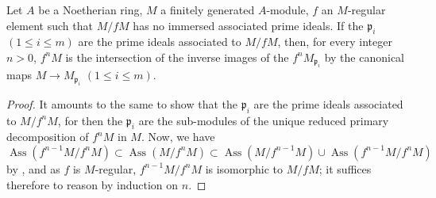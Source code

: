 \begin{proposition}[3.4.9]
\label{IV.3.4.9}
Let $A$ be a Noetherian ring, $M$ a finitely generated $A$-module, $f$ an $M$-regular element such that $M/fM$ has no immersed associated prime ideals.
If the $\mathfrak{p}_i$ $(1\leqslant i\leqslant m)$ are the prime ideals associated to $M/fM$, then, for every integer $n>0$, $f^n M$ is the intersection of the inverse images of the $f^n M_{\mathfrak{p}_i}$ by the canonical maps $M\to M_{\mathfrak{p}_i}$ $(1\leqslant i\leqslant m)$.
\end{proposition}

\begin{proof}
It amounts to the same to show that the $\mathfrak{p}_i$ are the prime ideals associated to $M/f^n M$, for then the $\mathfrak{p}_i$ are the sub-modules of the unique reduced primary decomposition of $f^n M$ in $M$.
Now, we have
\[
\operatorname{Ass}(f^{n-1}M/f^n M)\subset\operatorname{Ass}(M/f^n M)\subset\operatorname{Ass}(M/f^{n-1}M)\cup\operatorname{Ass}(f^{n-1}M/f^n M)
\]
by , and as $f$ is $M$-regular, $f^{n-1}M/f^n M$ is isomorphic to $M/fM$; it suffices therefore to reason by induction on $n$.
\end{proof}
